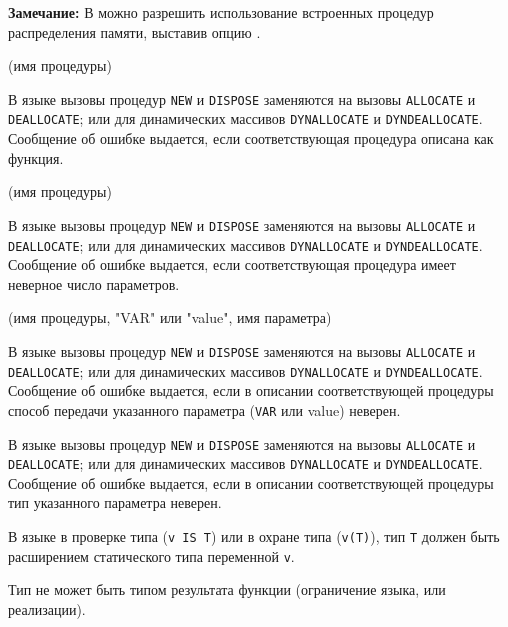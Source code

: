 {\bf Замечание:} В \xds{} можно разрешить использование встроенных
процедур распределения памяти,
выставив опцию .

(имя процедуры)

В языке \mt{} вызовы процедур \verb'NEW' и \verb'DISPOSE' заменяются на
вызовы \verb'ALLOCATE' и \verb'DEALLOCATE'; или для динамических массивов
\verb'DYNALLOCATE' и \verb'DYNDEALLOCATE'.
Сообщение об ошибке выдается, если соответствующая процедура описана 
как функция.

(имя процедуры)

В языке \mt{} вызовы процедур \verb'NEW' и \verb'DISPOSE' заменяются на
вызовы \verb'ALLOCATE' и \verb'DEALLOCATE'; или для динамических массивов
\verb'DYNALLOCATE' и \verb'DYNDEALLOCATE'.
Сообщение об ошибке выдается, если соответствующая процедура 
имеет неверное число параметров.

(имя процедуры, "VAR" или "value", имя параметра)

В языке \mt{} вызовы процедур \verb'NEW' и \verb'DISPOSE' заменяются на
вызовы \verb'ALLOCATE' и \verb'DEALLOCATE'; или для динамических массивов
\verb'DYNALLOCATE' и \verb'DYNDEALLOCATE'.
Сообщение об ошибке выдается, если в описании соответствующей процедуры
способ передачи указанного параметра (\verb'VAR' или value) неверен.


В языке \mt{} вызовы процедур \verb'NEW' и \verb'DISPOSE' заменяются на
вызовы \verb'ALLOCATE' и \verb'DEALLOCATE'; или для динамических массивов
\verb'DYNALLOCATE' и \verb'DYNDEALLOCATE'.
Сообщение об ошибке выдается, если в описании соответствующей процедуры
тип указанного параметра неверен.


В языке \ot{} в проверке типа (\verb'v IS T') или в охране типа (\verb'v(T)'), 
тип \verb'T' должен быть расширением статического типа переменной \verb'v'.


Тип не может быть типом результата функции (ограничение языка, или
реализации).


